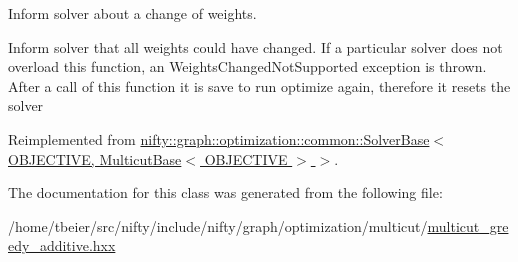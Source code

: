 Inform solver about a change of weights. 

Inform solver that all weights could have changed. If a particular solver does not overload this function, an Weights\+Changed\+Not\+Supported exception is thrown. After a call of this function it is save to run optimize again, therefore it resets the solver 

Reimplemented from \hyperlink{classnifty_1_1graph_1_1optimization_1_1common_1_1SolverBase_a8ab38d61068370e24cca475ef1b5d8b1}{nifty\+::graph\+::optimization\+::common\+::\+Solver\+Base$<$ O\+B\+J\+E\+C\+T\+I\+V\+E, Multicut\+Base$<$ O\+B\+J\+E\+C\+T\+I\+V\+E $>$ $>$}.



The documentation for this class was generated from the following file\+:\begin{DoxyCompactItemize}
\item 
/home/tbeier/src/nifty/include/nifty/graph/optimization/multicut/\hyperlink{multicut__greedy__additive_8hxx}{multicut\+\_\+greedy\+\_\+additive.\+hxx}\end{DoxyCompactItemize}
